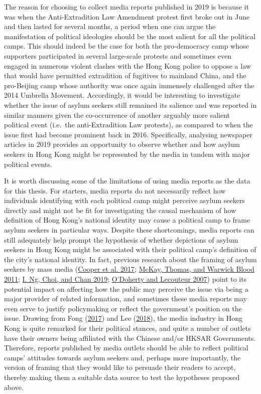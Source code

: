 \documentclass[a4paper, oneside]{report}
\begin{document}
The reason for choosing to collect media reports published in 2019 is
because it was when the Anti-Extradition Law Amendment protest first
broke out in June and then lasted for several months, a period when one
can argue the manifestation of political ideologies should be the most
salient for all the political camps. This should indeed be the case for
both the pro-democracy camp whose supporters participated in several
large-scale protests and sometimes even engaged in numerous violent
clashes with the Hong Kong police to oppose a law that would have
permitted extradition of fugitives to mainland China, and the
pro-Beijing camp whose authority was once again immensely challenged
after the 2014 Umbrella Movement. Accordingly, it would be interesting
to investigate whether the issue of asylum seekers still remained its
salience and was reported in similar manners given the co-occurrence of
another arguably more salient political event (i.e.~the anti-Extradition
Law protests), as compared to when the issue first had become prominent
back in 2016. Specifically, analysing newspaper articles in 2019
provides an opportunity to observe whether and how asylum seekers in
Hong Kong might be represented by the media in tandem with major
political events.

It is worth discussing some of the limitations of using media reports as
the data for this thesis. For starters, media reports do not necessarily
reflect how individuals identifying with each political camp might
perceive asylum seekers directly and might not be fit for investigating
the causal mechanism of how definition of Hong Kong's national identity
may cause a political camp to frame asylum seekers in particular ways.
Despite these shortcomings, media reports can still adequately help
prompt the hypothesis of whether depictions of asylum seekers in Hong
Kong might be associated with their political camp's definition of the
city's national identity. In fact, previous research about the framing
of asylum seekers by mass media
(\protect\hyperlink{ref-cooperMediaCoverageRefugees2017}{Cooper et al.
2017}; \protect\hyperlink{ref-mckayAnyOneThese2011}{McKay, Thomas, and
Warwick Blood 2011}; \protect\hyperlink{ref-ngFramingIssueAsylum2019}{I.
Ng, Choi, and Chan 2019};
\protect\hyperlink{ref-odohertyAsylumSeekersBoat2007}{O'Doherty and
Lecouteur 2007}) point to its potential impact on affecting how the
public may perceive the issue via being a major provider of related
information, and sometimes these media reports may even serve to justify
policymaking or reflect the government's position on the issue. Drawing
from Fong
(\protect\hyperlink{ref-fongInbetweenLiberalAuthoritarianism2017}{2017})
and Lee (\protect\hyperlink{ref-leeChangingPoliticalEconomy2018}{2018}),
the media industry in Hong Kong is quite remarked for their political
stances, and quite a number of outlets have their owners being
affiliated with the Chinese and/or HKSAR Governments. Therefore, reports
published by media outlets should be able to reflect political camps'
attitudes towards asylum seekers and, perhaps more importantly, the
version of framing that they would like to persuade their readers to
accept, thereby making them a suitable data source to test the
hypotheses proposed above.
\end{document}
